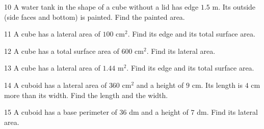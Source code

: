 \gap
\begin{probbox}{10}{\relax}
A water tank in the shape of a cube without a lid has edge $1.5$ m. Its outside (side faces and bottom) is painted. Find the painted area.
\end{probbox}
\gap
\begin{probbox}{11}{\relax}
A cube has a lateral area of $100$ cm$^2$. Find its edge and its total surface area.
\end{probbox}
\gap
\begin{probbox}{12}{\relax}
A cube has a total surface area of $600$ cm$^2$. Find its lateral area.
\end{probbox}
\gap
\begin{probbox}{13}{\relax}
A cube has a lateral area of $1.44$ m$^2$. Find its edge and its total surface area.
\end{probbox}
\gap
\begin{probbox}{14}{\relax}
A cuboid has a lateral area of $360$ cm$^2$ and a height of $9$ cm. Its length is $4$ cm more than its width. Find the length and the width.
\end{probbox}
\gap
\begin{probbox}{15}{\relax}
A cuboid has a base perimeter of $36$ dm and a height of $7$ dm. Find its lateral area.
\end{probbox}
